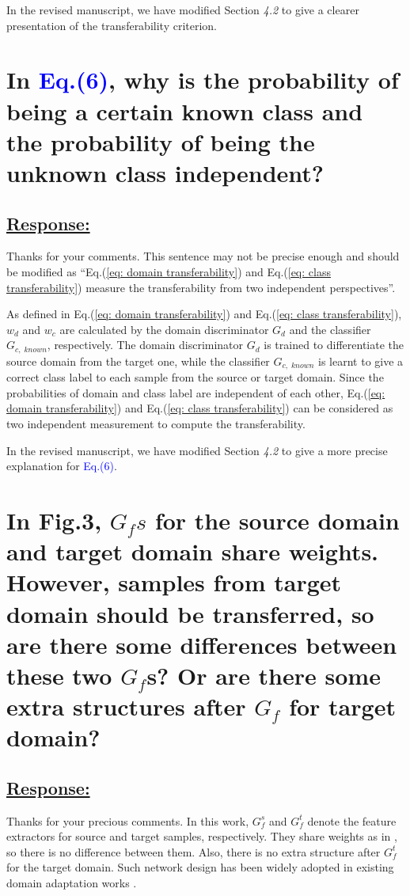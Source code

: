 In the revised manuscript, we have modified Section \textit{4.2} to give a clearer presentation of the transferability criterion.


\section{In \textcolor{blue}{Eq.(6)}, why is the probability of being a certain known class and the probability of being the unknown class independent? }
\subsection*{\underline{\textbf{Response:}}}

Thanks for your comments.
This sentence may not be precise enough and should be modified as ``Eq.(\ref{eq: domain transferability}) and Eq.(\ref{eq: class transferability}) measure the transferability from two independent perspectives''.

As defined in Eq.(\ref{eq: domain transferability}) and Eq.(\ref{eq: class transferability}), $w_d$ and $w_c$ are calculated by the domain discriminator $G_d$ and the classifier $G_{c,\; known}$, respectively.
The domain discriminator $G_d$ is trained to differentiate the source domain from the target one, while the classifier $G_{c,\; known}$ is learnt to give a correct class label to each sample from the source or target domain.
Since the probabilities of domain and class label are independent of each other, Eq.(\ref{eq: domain transferability}) and Eq.(\ref{eq: class transferability}) can be considered as two independent measurement to compute the transferability.

In the revised manuscript, we have modified Section \textit{4.2} to give a more precise explanation for \textcolor{blue}{Eq.(6)}.


\section{In Fig.3, $G_fs$ for the source domain and target domain share weights.
However, samples from target domain should be transferred, so are there some differences between these two $G_f$s?
Or are there some extra structures after $G_f$ for target domain?}
\subsection*{\underline{\textbf{Response:}}}

Thanks for your precious comments.
In this work, $G_f^s$ and $G_f^t$ denote the feature extractors for source and target samples, respectively.
They share weights as in \cite{OpensetDA-bp}, so there is no difference between them.
Also, there is no extra structure after $G_f^t$ for the target domain.
Such network design has been widely adopted in existing domain adaptation works \cite{OpensetDA-bp,PartialDA-tf,UniversalDomainAdaptation}.

